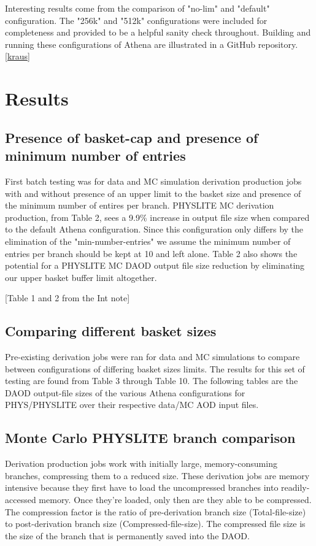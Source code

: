 Interesting results come from the comparison of "no-lim" and "default" configuration. The "256k" and "512k" configurations were included for completeness and provided to be a helpful sanity check throughout. 
Building and running these configurations of Athena are illustrated in a GitHub repository. \ref{kraus}

\section{Results}
\subsection{Presence of basket-cap and presence of minimum number of entries}

First batch testing was for data and MC simulation derivation production jobs with and without presence of an upper limit to the basket size and presence of the minimum number of entires per branch. PHYSLITE MC derivation production, from Table 2, sees a 9.9\% increase in output file size when compared to the default Athena configuration. Since this configuration only differs by the elimination of the "min-number-entries" we assume the minimum number of entries per branch should be kept at 10 and left alone. Table 2 also shows the potential for a PHYSLITE MC DAOD output file size reduction by eliminating our upper basket buffer limit altogether.  

[Table 1 and 2 from the Int note]

\subsection{Comparing different basket sizes}

Pre-existing derivation jobs were ran for data and MC simulations to compare between configurations of differing basket sizes limits. The results for this set of testing are found from Table 3 through Table 10. The following tables are the DAOD output-file sizes of the various Athena configurations for PHYS/PHYSLITE over their respective data/MC AOD input files. 

\subsection{Monte Carlo PHYSLITE branch comparison}

Derivation production jobs work with initially large, memory-consuming branches, compressing them to a reduced size. These derivation jobs are memory intensive because they first have to load the uncompressed branches into readily-accessed memory. Once they're loaded, only then are they able to be compressed. The compression factor is the ratio of pre-derivation branch size (Total-file-size) to post-derivation branch size (Compressed-file-size). The compressed file size is the size of the branch that is permanently saved into the DAOD.  

